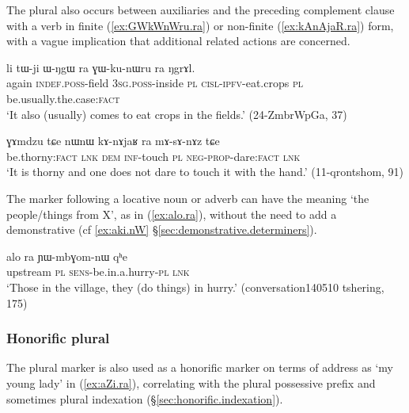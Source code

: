  
The plural  also occurs between auxiliaries and the preceding complement clause with a verb in finite (\ref{ex:GWkWnWru.ra}) or non-finite (\ref{ex:kAnAjaR.ra}) form, with a vague implication that additional related actions are concerned.

\begin{exe}
\ex \label{ex:GWkWnWru.ra}
 \gll li tɯ-ji ɯ-ŋgɯ ra ɣɯ-ku-nɯru ra ŋgrɤl. \\
 again \textsc{indef}.\textsc{poss}-field \textsc{3sg}.\textsc{poss}-inside \textsc{pl} \textsc{cisl}-\textsc{ipfv}-eat.crops \textsc{pl} be.usually.the.case:\textsc{fact} \\
\glt `It also (usually) comes to eat crops in the fields.' (24-ZmbrWpGa, 37)
\end{exe}

\begin{exe}
\ex \label{ex:kAnAjaR.ra}
 \gll  ɣɤmdzu tɕe nɯnɯ kɤ-nɤjaʁ ra mɤ-sɤ-nɤz tɕe \\
be.thorny:\textsc{fact} \textsc{lnk} \textsc{dem} \textsc{inf}-touch \textsc{pl} \textsc{neg}-\textsc{prop}-dare:\textsc{fact} \textsc{lnk} \\
\glt `It is thorny and one does not dare to touch it with the hand.' (11-qrontshom, 91)
\end{exe}

The marker  following a locative noun or adverb can have the meaning `the people/things from X', as in (\ref{ex:alo.ra}), without the need to add a demonstrative (cf \ref{ex:aki.nW} §\ref{sec:demonstrative.determiners}).

\begin{exe}
\ex \label{ex:alo.ra}
 \gll alo ra ɲɯ-mbɣom-nɯ qʰe \\
 upstream \textsc{pl} \textsc{sens}-be.in.a.hurry-\textsc{pl} \textsc{lnk} \\
 \glt `Those in the village, they (do things) in hurry.' (conversation140510 tshering, 175)
\end{exe}

\subsubsection{Honorific plural} \label{sec:ra.honorific}
The plural marker  is also used as a honorific marker on terms of address as  `my young lady' in (\ref{ex:aZi.ra}), correlating with the plural possessive prefix  and sometimes plural indexation (§\ref{sec:honorific.indexation}).

